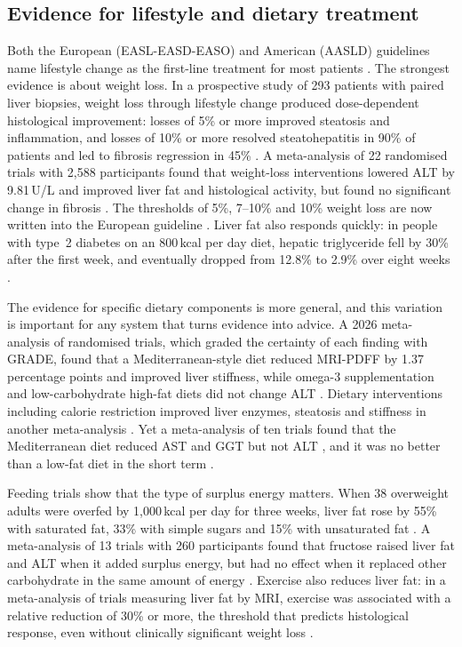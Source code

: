 \subsection{Evidence for lifestyle and dietary treatment}

Both the European (EASL-EASD-EASO) and American (AASLD) guidelines name lifestyle change as the first-line treatment for most patients \cite{easl2024masld,rinella2023aasld}. The strongest evidence is about weight loss. In a prospective study of 293 patients with paired liver biopsies, weight loss through lifestyle change produced dose-dependent histological improvement: losses of 5\% or more improved steatosis and inflammation, and losses of 10\% or more resolved steatohepatitis in 90\% of patients and led to fibrosis regression in 45\% \cite{vilargomez2015weight}. A meta-analysis of 22 randomised trials with 2,588 participants found that weight-loss interventions lowered ALT by 9.81\,U/L and improved liver fat and histological activity, but found no significant change in fibrosis \cite{koutoukidis2019weightloss}. The thresholds of 5\%, 7--10\% and 10\% weight loss are now written into the European guideline \cite{easl2024masld}. Liver fat also responds quickly: in people with type~2 diabetes on an 800\,kcal per day diet, hepatic triglyceride fell by 30\% after the first week, and eventually dropped from 12.8\% to 2.9\% over eight weeks \cite{lim2011reversal}.

The evidence for specific dietary components is more general, and this variation is important for any system that turns evidence into advice. A 2026 meta-analysis of randomised trials, which graded the certainty of each finding with GRADE, found that a Mediterranean-style diet reduced MRI-PDFF by 1.37 percentage points and improved liver stiffness, while omega-3 supplementation and low-carbohydrate high-fat diets did not change ALT \cite{stern2026dietary}. Dietary interventions including calorie restriction improved liver enzymes, steatosis and stiffness in another meta-analysis \cite{haigh2022mediterranean}. Yet a meta-analysis of ten trials found that the Mediterranean diet reduced AST and GGT but not ALT \cite{sangouni2022mediterranean}, and it was no better than a low-fat diet in the short term \cite{xiong2024mediterranean}.

Feeding trials show that the type of surplus energy matters. When 38 overweight adults were overfed by 1,000\,kcal per day for three weeks, liver fat rose by 55\% with saturated fat, 33\% with simple sugars and 15\% with unsaturated fat \cite{luukkonen2018saturated}. A meta-analysis of 13 trials with 260 participants found that fructose raised liver fat and ALT when it added surplus energy, but had no effect when it replaced other carbohydrate in the same amount of energy \cite{chiu2014fructose}. Exercise also reduces liver fat: in a meta-analysis of trials measuring liver fat by MRI, exercise was associated with a relative reduction of 30\% or more, the threshold that predicts histological response, even without clinically significant weight loss \cite{stine2023exercise}.

